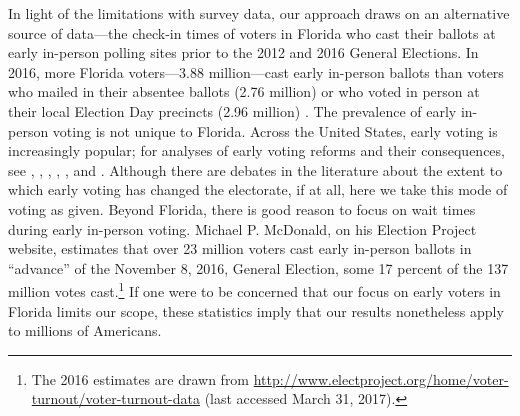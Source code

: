 \documentclass[12pt,titlepage]{article}
\begin{document}
In light of the limitations with survey data, our approach draws on an
alternative source of data---the check-in times of voters in Florida
who cast their ballots at early in-person polling sites prior to the
2012 and 2016 General Elections.  In 2016, more Florida voters---3.88
million---cast early in-person ballots than voters who mailed in their
absentee ballots (2.76 million) or who voted in person at their local
Election Day precincts (2.96 million) \citep{FDOS:2016vote}. The
prevalence of early in-person voting is not unique to Florida. Across
the United States, early voting is increasingly popular; for analyses
of early voting reforms and their consequences, see
\citet{neelyrichardson:earlyvoting}, \citet{gronke:2012},
\citet{gronke:earlyvotingreforms}, \citet{gronketoffey:psychological},
\citet{gronkebaum:growth}, and \citet{burdenetal:unanticipated}.
Although there are debates in the literature about the extent to which
early voting has changed the electorate, if at all, here we take this
mode of voting as given. Beyond Florida, there is good reason to focus
on wait times during early in-person voting.  Michael P. McDonald, on
his Election Project website, estimates that over 23 million voters
cast early in-person ballots in ``advance'' of the November 8, 2016,
General Election, some 17 percent of the 137 million votes
cast.\footnote{The 2016 estimates are drawn from
  \url{http://www.electproject.org/home/voter-turnout/voter-turnout-data}
  (last accessed March 31, 2017).}  If one were to be concerned that
our focus on early voters in Florida limits our scope, these
statistics imply that our results nonetheless apply to millions of
Americans.
\end{document}
